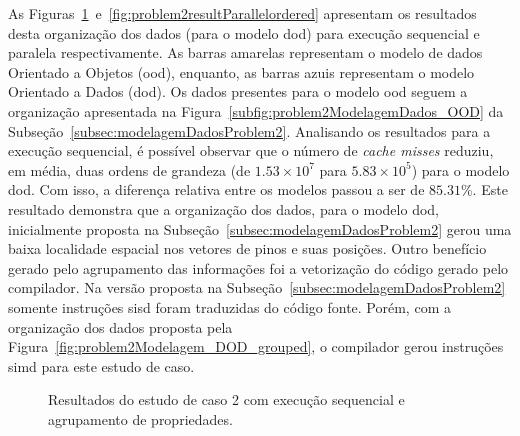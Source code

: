 As Figuras~\ref{fig:problem2resultSequencialordered}~e~\ref{fig:problem2resultParallelordered} apresentam os resultados desta organização dos dados (para o modelo \ac{dod}) para execução sequencial e paralela respectivamente. 
As barras amarelas representam o modelo de dados Orientado a Objetos (\ac{ood}), enquanto, as barras azuis representam o modelo Orientado a Dados (\ac{dod}).
Os dados presentes para o modelo \ac{ood} seguem a organização apresentada na Figura~\ref{subfig:problem2ModelagemDados_OOD} da Subseção~\ref{subsec:modelagemDadosProblem2}.
Analisando os resultados para a execução sequencial, é possível observar que o número de  \textit{cache misses} reduziu, em média, duas ordens de grandeza (de $1.53\times10^7$ para $5.83\times10^5$) para o modelo \ac{dod}. Com isso, a diferença relativa entre os modelos passou a ser de $85.31\%$. Este resultado demonstra que a organização dos dados, para o modelo \ac{dod}, inicialmente proposta na Subseção~\ref{subsec:modelagemDadosProblem2} gerou uma baixa localidade espacial nos vetores de pinos e suas posições.
Outro benefício gerado pelo agrupamento das informações foi a vetorização do código gerado pelo compilador. Na versão proposta na Subseção~\ref{subsec:modelagemDadosProblem2} somente instruções \ac{sisd} foram traduzidas do código fonte. Porém, com a organização dos dados proposta pela Figura~\ref{fig:problem2Modelagem_DOD_grouped}, o compilador gerou instruções \ac{simd} para este estudo de caso.

\begin{figure}[ht]
    \centering
    \caption{Resultados do estudo de caso 2 com execução sequencial e agrupamento de propriedades.}
    \label{fig:problem2resultSequencialordered}
\end{figure}

